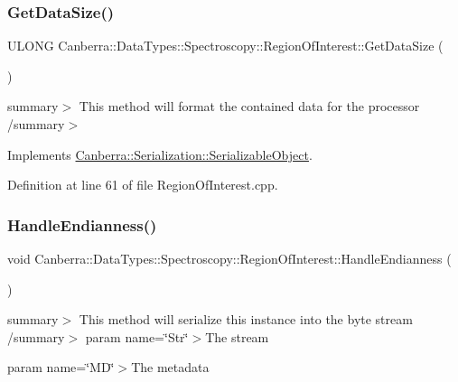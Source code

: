 \subsubsection{\texorpdfstring{Get\+Data\+Size()}{GetDataSize()}}
{\footnotesize\ttfamily U\+L\+O\+NG Canberra\+::\+Data\+Types\+::\+Spectroscopy\+::\+Region\+Of\+Interest\+::\+Get\+Data\+Size (\begin{DoxyParamCaption}{ }\end{DoxyParamCaption})\hspace{0.3cm}{\ttfamily [virtual]}}

summary$>$ This method will format the contained data for the processor /summary$>$ 

Implements \hyperlink{class_canberra_1_1_serialization_1_1_serializable_object}{Canberra\+::\+Serialization\+::\+Serializable\+Object}.



Definition at line 61 of file Region\+Of\+Interest.\+cpp.

\mbox{\label{class_canberra_1_1_data_types_1_1_spectroscopy_1_1_region_of_interest_ac1fa66449af9ef06c5c29b9cb32d0c62_ac1fa66449af9ef06c5c29b9cb32d0c62}} 
\subsubsection{\texorpdfstring{Handle\+Endianness()}{HandleEndianness()}}
{\footnotesize\ttfamily void Canberra\+::\+Data\+Types\+::\+Spectroscopy\+::\+Region\+Of\+Interest\+::\+Handle\+Endianness (\begin{DoxyParamCaption}{ }\end{DoxyParamCaption})\hspace{0.3cm}{\ttfamily [protected]}}

summary$>$ This method will serialize this instance into the byte stream /summary$>$ param name=\char`\"{}\+Str\char`\"{}$>$The stream

param name=\char`\"{}\+M\+D\char`\"{}$>$The metadata

